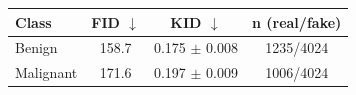 \begin{tabular}{lccc}
\toprule
Class & FID $\downarrow$ & KID $\downarrow$ & n (real/fake) \\
\midrule
Benign & 158.7 & 0.175 $\pm$ 0.008 & 1235/4024 \\
Malignant & 171.6 & 0.197 $\pm$ 0.009 & 1006/4024 \\
\bottomrule
\end{tabular}